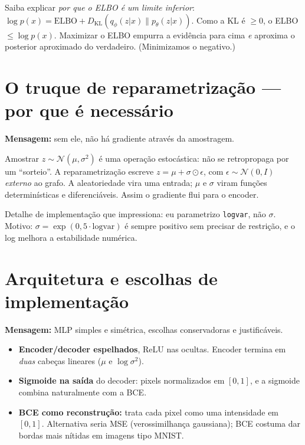 \documentclass[11pt,a4paper]{article}
\begin{document}
\begin{dica}
Saiba explicar \emph{por que o ELBO é um limite inferior}: $\log p(x) =
\mathrm{ELBO} + D_{\mathrm{KL}}(q_\phi(z|x)\|p_\theta(z|x))$. Como a KL é
$\ge 0$, o ELBO $\le \log p(x)$. Maximizar o ELBO empurra a evidência para cima
\emph{e} aproxima o posterior aproximado do verdadeiro. (Minimizamos o negativo.)
\end{dica}

\section{O truque de reparametrização --- por que é necessário}

\textbf{Mensagem:} sem ele, não há gradiente através da amostragem.

Amostrar $z\sim\mathcal{N}(\mu,\sigma^2)$ é uma operação estocástica: não se
retropropaga por um ``sorteio''. A reparametrização escreve
$z=\mu+\sigma\odot\epsilon$, com $\epsilon\sim\mathcal{N}(0,I)$ \emph{externo} ao
grafo. A aleatoriedade vira uma entrada; $\mu$ e $\sigma$ viram funções
determinísticas e diferenciáveis. Assim o gradiente flui para o encoder.

\begin{dica}
Detalhe de implementação que impressiona: eu parametrizo \texttt{logvar}, não
$\sigma$. Motivo: $\sigma=\exp(0{,}5\cdot\text{logvar})$ é sempre positivo sem
precisar de restrição, e o log melhora a estabilidade numérica.
\end{dica}

\section{Arquitetura e escolhas de implementação}

\textbf{Mensagem:} MLP simples e simétrica, escolhas conservadoras e
justificáveis.

\begin{itemize}[leftmargin=1.2em, itemsep=0.1em]
\item \textbf{Encoder/decoder espelhados}, ReLU nas ocultas. Encoder termina em
\emph{duas} cabeças lineares ($\mu$ e $\log\sigma^2$).
\item \textbf{Sigmoide na saída} do decoder: pixels normalizados em $[0,1]$, e a
sigmoide combina naturalmente com a BCE.
\item \textbf{BCE como reconstrução:} trata cada pixel como uma intensidade em
$[0,1]$. Alternativa seria MSE (verossimilhança gaussiana); BCE costuma dar
bordas mais nítidas em imagens tipo MNIST.
\end{itemize}
\end{document}
